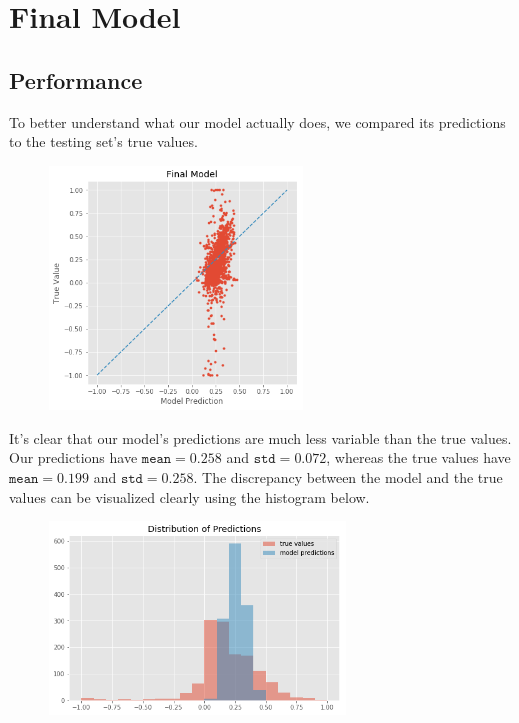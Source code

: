 \documentclass[11pt, letterpaper, headings=standardclasses]{scrartcl}
\begin{document}
	\section{Final Model}
	
	\subsection{Performance}
    To better understand what our model actually does, we compared its predictions to the testing set's true values.
    \begin{figure}[H]
    \centering
    \includegraphics[width=0.6\textwidth]{final_model_predictions.png}
    \end{figure}
    It's clear that our model's predictions are much less variable than the true values. Our predictions have $\texttt{mean}=0.258$ and $\texttt{std}=0.072$, whereas the true values have $\texttt{mean}=0.199$ and $\texttt{std}=0.258$. The discrepancy between the model and the true values can be visualized clearly using the histogram below. 
    \begin{figure}[H]
    \centering
    \includegraphics[width=0.7\textwidth]{dist_predictions.png}
    \end{figure}
\end{document}
